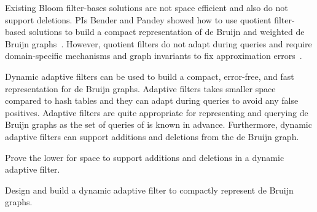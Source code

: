 Existing Bloom filter-bases solutions are not space efficient and also do not support deletions. PIs Bender and Pandey showed how to use quotient filter-based solutions to build a compact representation of de Bruijn and weighted de Bruijn graphs~\cite{PandeyBJP17b}. However, quotient filters do not adapt during queries and require domain-specific mechanisms and graph invariants to fix approximation errors~\cite{PandeyBJP17b}.

Dynamic adaptive filters can be used to build a compact, error-free, and fast representation for de Bruijn graphs. Adaptive filters takes smaller space compared to hash tables and they can adapt during queries to avoid any false positives. Adaptive filters are quite appropriate for representing and querying de Bruijn graphs as the set of queries of is known in advance. Furthermore, dynamic adaptive filters can support \kmer additions and deletions from the de Bruijn graph.


\begin{rproblem}
Prove the lower for space to support additions and deletions in a dynamic adaptive filter.
\end{rproblem}

\begin{rproblem}
Design and build a dynamic adaptive filter to compactly represent de Bruijn graphs.
\end{rproblem}






